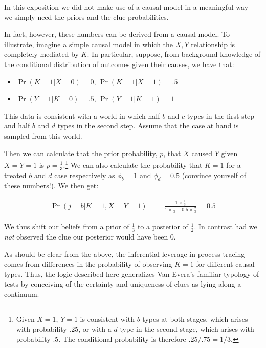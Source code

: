 \documentclass[12pt,]{book}
\providecommand{\tightlist}{%
  \setlength{\itemsep}{0pt}\setlength{\parskip}{0pt}}
\let\rmarkdownfootnote\footnote%
\def\footnote{\protect\rmarkdownfootnote}
\begin{document}
In this exposition we did not make use of a causal model in a meaningful way---we simply need the priors and the clue probabilities.

In fact, however, these numbers can be derived from a causal model. To illustrate, imagine a simple causal model in which the \(X, Y\) relationship is completely mediated by \(K\). In particular, suppose, from background knowledge of the conditional distribution of outcomes given their causes, we have that:

\begin{itemize}
\tightlist
\item
  \(\Pr(K=1 | X=0) = 0\), \(\Pr(K=1 | X=1) = .5\)
\item
  \(\Pr(Y=1 | K=0) = .5\), \(\Pr(Y=1 | K=1) = 1\)
\end{itemize}

This data is consistent with a world in which half \(b\) and \(c\) types in the first step and half \(b\) and \(d\) types in the second step. Assume that the case at hand is sampled from this world.

Then we can calculate that the prior probability, \(p\), that \(X\) caused \(Y\) given \(X=Y=1\) is \(p = \frac13\).\footnote{Given \(X=1\), \(Y=1\) is consistent with \(b\) types at both stages, which arises with probability .25, or with a \(d\) type in the second stage, which arises with probability .5. The conditional probability is therefore \(.25/.75 = 1/3\).} We can also calculate the probability that \(K=1\) for a treated \(b\) and \(d\) case respectively as \(\phi_b=1\) and \(\phi_d=0.5\) (convince yourself of these numbers!). We then get:

\begin{eqnarray*}
\Pr(j = b |K=1, X=Y=1)&=&\frac{1\times \frac13}{1 \times \frac13 + 0.5 \times \frac23}=0.5
\end{eqnarray*}

We thus shift our beliefs from a prior of \(\frac13\) to a posterior of \(\frac12\). In contrast had we \emph{not} observed the clue our posterior would have been 0.

As should be clear from the above, the inferential leverage in process tracing comes from differences in the probability of observing \(K=1\) for different causal types. Thus, the logic described here generalizes Van Evera's familiar typology of tests by conceiving of the certainty and uniqueness of clues as lying along a continuum.
\end{document}
